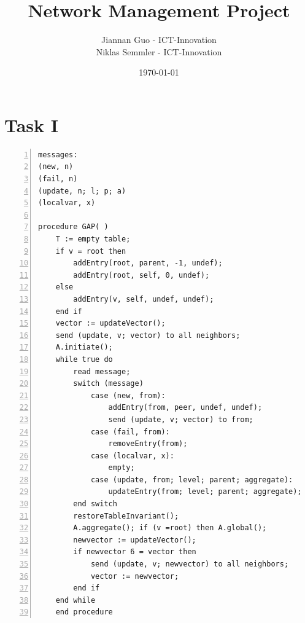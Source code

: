\documentclass[a4paper, smallheadings,english]{scrartcl}
\newcommand{\Author}{Jiannan Guo - ICT-Innovation\\Niklas Semmler - ICT-Innovation}
\newcommand{\Title}{Network Management Project}
\begin{document}
\title{\Title}
\author{\Author}
\date{\today}
\maketitle
\thispagestyle{firststyle}
\section{Task I}
\begin{lstlisting}[caption={inspired by \cite{stadler2012protocols}}, numbers=left, frame=single]
messages:
(new, n)
(fail, n)
(update, n; l; p; a)
(localvar, x)

procedure GAP( )
    T := empty table;
    if v = root then
        addEntry(root, parent, -1, undef);
        addEntry(root, self, 0, undef);
    else
        addEntry(v, self, undef, undef);
    end if
    vector := updateVector();
    send (update, v; vector) to all neighbors;
    A.initiate();
    while true do
        read message;
        switch (message)
            case (new, from):
                addEntry(from, peer, undef, undef);
                send (update, v; vector) to from;
            case (fail, from):
                removeEntry(from);
            case (localvar, x):
                empty;
            case (update, from; level; parent; aggregate):
                updateEntry(from; level; parent; aggregate);
        end switch
        restoreTableInvariant();
        A.aggregate(); if (v =root) then A.global();
        newvector := updateVector();
        if newvector 6 = vector then
            send (update, v; newvector) to all neighbors;
            vector := newvector;
        end if
    end while
    end procedure
\end{lstlisting}
\end{document}
